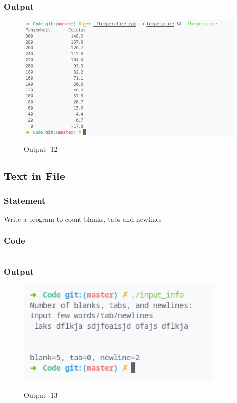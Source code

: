 \subsubsection{Output}
\begin{figure}[!htb]
  \centering
  \includegraphics[width=6in]{Images/temperature.png}
  \label{Output-12}
  \caption{Output- 12}
\end{figure}


\pagebreak
\subsection{Text in File}
\subsubsection{Statement}
Write a program to count blanks, tabs and newlines
\subsubsection{Code}
\inputminted[]{c}{../Code/input_info.cpp}
\subsubsection{Output}
\begin{figure}[!htb]
  \centering
  \includegraphics[width=4in]{Images/input_info.png}
  \label{Output-13}
  \caption{Output- 13}
\end{figure}


